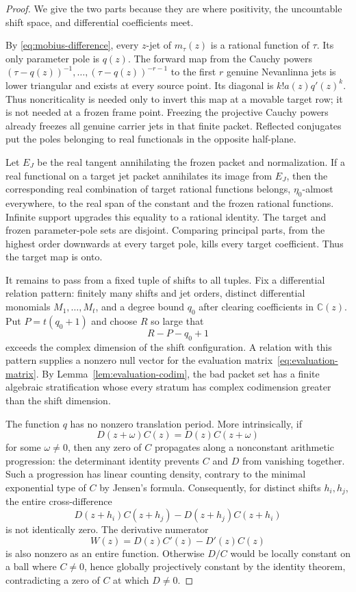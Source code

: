 \documentclass[11pt]{article}
\newcommand{\C}{\mathbb C}
\begin{document}
\begin{proof}
We give the two parts because they are where positivity, the uncountable shift space, and
differential coefficients meet.

By \eqref{eq:mobius-difference}, every $z$-jet of $m_\tau(z)$ is a rational function of $\tau$.
Its only parameter pole is $q(z)$.  The forward map from the Cauchy powers
$(\tau-q(z))^{-1},\ldots,(\tau-q(z))^{-r-1}$ to the first $r$ genuine Nevanlinna jets is lower
triangular and exists at every source point.  Its diagonal is $k!a(z)q'(z)^k$.  Thus
noncriticality is needed only to invert this map at a movable target row; it is not needed at a
frozen frame point.  Freezing the projective Cauchy powers already freezes all genuine carrier
jets in that finite packet.  Reflected conjugates put the poles belonging to real functionals in
the opposite half-plane.

Let $E_J$ be the real tangent annihilating the frozen packet and normalization.  If a real
functional on a target jet packet annihilates its image from $E_J$, then the corresponding real
combination of target rational functions belongs, $\eta_0$-almost everywhere, to the real span of
the constant and the frozen rational functions.  Infinite support upgrades this equality to a
rational identity.  The target and frozen parameter-pole sets are disjoint.  Comparing principal
parts, from the highest order downwards at every target pole, kills every target coefficient.
Thus the target map is onto.

It remains to pass from a fixed tuple of shifts to all tuples.  Fix a differential relation
pattern: finitely many shifts and jet orders, distinct differential monomials
$M_1,\ldots,M_t$, and a degree bound $q_0$ after clearing coefficients in $\C(z)$.  Put
$P=t(q_0+1)$ and choose $R$ so large that
\[
  R-P-q_0+1
\]
exceeds the complex dimension of the shift configuration.  A relation with this pattern supplies
a nonzero null vector for the evaluation matrix~\eqref{eq:evaluation-matrix}.  By
Lemma~\ref{lem:evaluation-codim}, the bad packet set has a finite algebraic stratification whose
every stratum has complex codimension greater than the shift dimension.

The function $q$ has no nonzero translation period.  More intrinsically, if
\[
 D(z+\omega)C(z)=D(z)C(z+\omega)
\]
for some $\omega\ne0$, then any zero of $C$ propagates along a nonconstant arithmetic progression:
the determinant identity prevents $C$ and $D$ from vanishing together.  Such a progression has
linear counting density, contrary to the minimal exponential type of $C$ by Jensen's formula.
Consequently, for distinct shifts $h_i,h_j$, the entire cross-difference
\[
 D(z+h_i)C(z+h_j)-D(z+h_j)C(z+h_i)
\]
is not identically zero.  The derivative numerator
\[
 W(z)=D(z)C'(z)-D'(z)C(z)
\]
is also nonzero as an entire function.  Otherwise $D/C$ would be locally constant on a ball where
$C\ne0$, hence globally projectively constant by the identity theorem, contradicting a zero of
$C$ at which $D\ne0$.


\end{proof}
\end{document}
